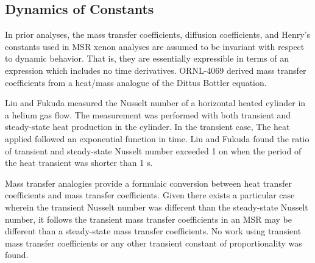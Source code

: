 \subsection{Dynamics of Constants}
In prior analyses, the mass transfer coefficients, diffusion coefficients, and Henry's constants used in MSR xenon analyses are assumed to be invariant with respect to dynamic behavior.  That is, they are essentially expressible in terms of an expression which includes no time derivatives.  ORNL-4069 derived mass transfer coefficients from a heat/mass analogue of the Dittus Bottler equation. \cite[p. 71]{ORNL4069}
 

Liu and Fukuda measured the Nusselt number of a horizontal heated cylinder in a helium gas flow. \cite{Liu02} The measurement was performed with both transient and steady-state heat production in the cylinder. In the transient case,  The heat applied followed an exponential function in time.  Liu and Fukuda found the ratio of transient and steady-state Nusselt number exceeded 1 on when the period of the heat transient was shorter than 1 s. 

Mass transfer analogies provide a formulaic conversion between heat transfer coefficients and mass transfer coefficients.  Given there exists a particular case wherein the transient Nusselt number was different than the steady-state Nusselt number, it follows the transient mass transfer coefficients in an MSR may be different than a steady-state mass transfer coefficients.  No work using transient mass transfer coefficients or any other transient constant of proportionality was found.